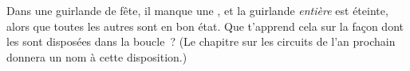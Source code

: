\begin{exercise}[$\star\star$]\label{exo:g3:first-electric-circuit:11}
Dans une guirlande de fête, il manque une , et la guirlande
\emph{entière} est éteinte, alors que toutes les autres  sont
en bon état. Que t'apprend cela sur la façon dont les  sont
disposées dans la boucle~? (Le chapitre sur les circuits de l'an
prochain donnera un nom à cette disposition.)
\end{exercise}
